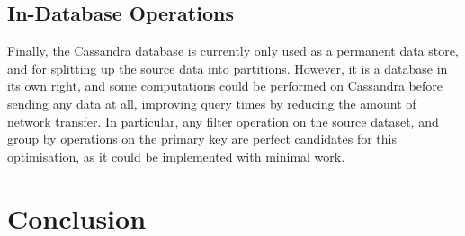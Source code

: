 \subsection{In-Database Operations}
Finally, the Cassandra database is currently only used as a permanent data store, and for splitting up the source data into partitions. However, it is a database in its own right, and some computations could be performed on Cassandra before sending any data at all, improving query times by reducing the amount of network transfer. In particular, any filter operation on the source dataset, and group by operations on the primary key are perfect candidates for this optimisation, as it could be implemented with minimal work.


\section{Conclusion}
